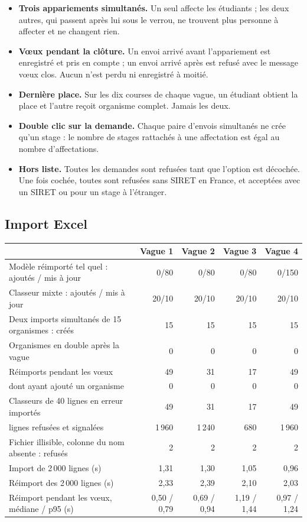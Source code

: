 \documentclass[11pt,a4paper]{article}
\begin{document}
\begin{itemize}
  \item \textbf{Trois appariements simultanés.} Un seul affecte les étudiants ; les deux autres,
    qui passent après lui sous le verrou, ne trouvent plus personne à affecter et ne changent
    rien.
  \item \textbf{Vœux pendant la clôture.} Un envoi arrivé avant l'appariement est enregistré et
    pris en compte ; un envoi arrivé après est refusé avec le message \og vœux clos\fg{}. Aucun
    n'est perdu ni enregistré à moitié.
  \item \textbf{Dernière place.} Sur les dix courses de chaque vague, un étudiant obtient la place
    et l'autre reçoit \og organisme complet\fg{}. Jamais les deux.
  \item \textbf{Double clic sur la demande.} Chaque paire d'envois simultanés ne crée qu'un stage :
    le nombre de stages rattachés à une affectation est égal au nombre d'affectations.
  \item \textbf{Hors liste.} Toutes les demandes sont refusées tant que l'option est décochée.
    Une fois cochée, toutes sont refusées sans SIRET en France, et acceptées avec un SIRET ou pour
    un stage à l'étranger.
\end{itemize}

\subsection{Import Excel}

\begin{center}
\begin{tabularx}{\linewidth}{@{}X r r r r@{}}
\toprule
& \textbf{Vague 1} & \textbf{Vague 2} & \textbf{Vague 3} & \textbf{Vague 4} \\
\midrule
Modèle réimporté tel quel : ajoutés / mis à jour & 0/80 & 0/80 & 0/80 & 0/150 \\
Classeur mixte : ajoutés / mis à jour & 20/10 & 20/10 & 20/10 & 20/10 \\
Deux imports simultanés de 15 organismes : créés & 15 & 15 & 15 & 15 \\
Organismes en double après la vague & 0 & 0 & 0 & 0 \\
Réimports pendant les vœux & 49 & 31 & 17 & 49 \\
\quad dont ayant ajouté un organisme & 0 & 0 & 0 & 0 \\
Classeurs de 40 lignes en erreur importés & 49 & 31 & 17 & 49 \\
\quad lignes refusées et signalées & 1\,960 & 1\,240 & 680 & 1\,960 \\
Fichier illisible, colonne du nom absente : refusés & 2 & 2 & 2 & 2 \\
Import de 2\,000 lignes (s) & 1{,}31 & 1{,}30 & 1{,}05 & 0{,}96 \\
Réimport des 2\,000 lignes (s) & 2{,}33 & 2{,}39 & 2{,}10 & 2{,}03 \\
Réimport pendant les vœux, médiane / p95 (s) & 0{,}50 / 0{,}79 & 0{,}69 / 0{,}94 & 1{,}19 / 1{,}44 & 0{,}97 / 1{,}24 \\
\bottomrule
\end{tabularx}
\end{center}
\end{document}
